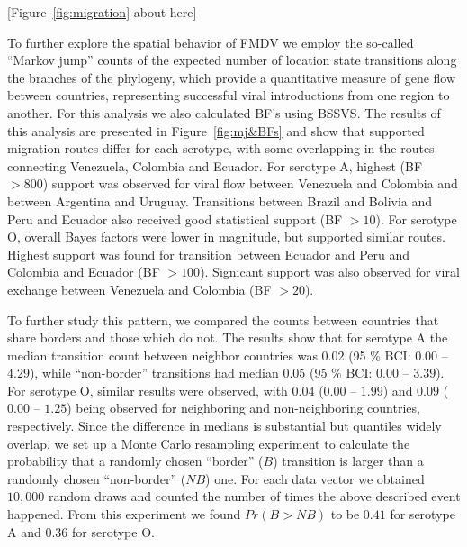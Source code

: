 \documentclass[10pt]{article}
\begin{document}
\begin{center}
 [Figure~\ref{fig:migration} about here]
\end{center}

To further explore the spatial behavior of FMDV we employ the so-called ``Markov jump'' counts \cite{Minin2008} of the expected number of location state transitions along the  branches of the phylogeny, which  provide a quantitative measure of gene flow between countries, representing successful viral introductions from one region to another. For this analysis we also calculated BF's using BSSVS.
The results of this analysis are presented in Figure~\ref{fig:mj&BFs} and show that supported migration routes differ for each serotype, with some overlapping in the routes connecting Venezuela, Colombia and Ecuador.
For serotype A, highest (BF $>800$) support was observed for viral flow between Venezuela and Colombia and between Argentina and Uruguay.
Transitions between Brazil and Bolivia and Peru and Ecuador also received good statistical support (BF $>10$).
For serotype O, overall Bayes factors were lower in magnitude, but supported similar routes.
Highest support was found for transition between Ecuador and Peru and Colombia and Ecuador (BF $>100$). Signicant support was also observed for viral exchange between Venezuela and Colombia (BF $>20$). 


To further study this pattern, we compared the counts between countries that share borders and those which do not.
The results show that for serotype A the median transition count between neighbor countries was $0.02$ (95 \% BCI: $0.00$ -- $4.29$), while ``non-border'' transitions had median $0.05$ (95 \% BCI: $0.00$ --  $3.39$).
For serotype O, similar results were observed, with $0.04$ ($0.00$ -- $1.99$) and $0.09$ ($0.00$ -- $1.25$) being observed for neighboring and non-neighboring countries, respectively.
Since the difference in medians is substantial but quantiles widely overlap, we set up a Monte Carlo resampling experiment to calculate the probability that a randomly chosen ``border'' ($B$) transition is larger than a randomly chosen ``non-border'' ($NB$) one. For each data vector we obtained $10,000$ random draws and counted the number of times the above described event happened. From this experiment we found $Pr(B>NB)$  to be $0.41$ for serotype A and $0.36$ for serotype O.
\end{document}
